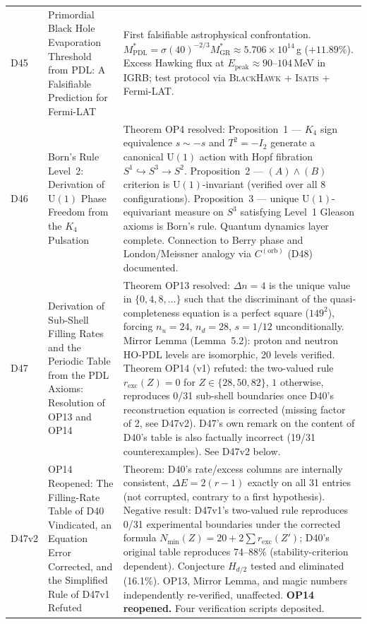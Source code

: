 \documentclass[11pt,a4paper]{article}
\theoremstyle{plain}
\theoremstyle{definition}
\theoremstyle{remark}
\begin{document}
\begin{longtable}{L{1.3cm}L{3.8cm}L{8.0cm}}
D45 & Primordial Black Hole Evaporation Threshold from PDL: A Falsifiable Prediction for Fermi-LAT~\cite{D45} & First falsifiable astrophysical confrontation. $M^*_{\mathrm{PDL}} = \sigma(40)^{-2/3} M^*_{\mathrm{GR}} \approx 5.706 \times 10^{14}$\,g ($+11.89\%$). Excess Hawking flux at $E_{\mathrm{peak}} \approx 90$--$104$\,MeV in IGRB; test protocol via \textsc{BlackHawk} + \textsc{Isatis} + Fermi-LAT.\\[0.4em]
D46 & Born's Rule Level~2: Derivation of $\mathrm{U}(1)$ Phase Freedom from the $K_4$ Pulsation~\cite{D46} & \textcolor{proofblue}{Theorem} OP4 resolved: Proposition~1 — $K_4$ sign equivalence $s \sim -s$ and $T^2=-I_2$ generate a canonical $\mathrm{U}(1)$ action with Hopf fibration $S^1\hookrightarrow S^3\to S^2$. Proposition~2 — $(A)\wedge(B)$ criterion is $\mathrm{U}(1)$-invariant (verified over all 8 configurations). Proposition~3 — unique $\mathrm{U}(1)$-equivariant measure on $S^3$ satisfying Level~1 Gleason axioms is Born's rule. Quantum dynamics layer complete. Connection to Berry phase and London/Meissner analogy via $C^{(\mathrm{orb})}$ (D48) documented.\\[0.4em]
D47 & Derivation of Sub-Shell Filling Rates and the Periodic Table from the PDL Axioms: Resolution of OP13 and OP14~\cite{D47} & \textcolor{proofblue}{Theorem} OP13 resolved: $\Delta n=4$ is the unique value in $\{0,4,8,\ldots\}$ such that the discriminant of the quasi-completeness equation is a perfect square ($149^2$), forcing $n_u=24$, $n_d=28$, $s=1/12$ unconditionally. Mirror Lemma (Lemma~5.2): proton and neutron HO-PDL levels are isomorphic, 20 levels verified. \textcolor{negativered}{Theorem OP14 (v1) refuted}: the two-valued rule $r_{\mathrm{exc}}(Z)=0$ for $Z\in\{28,50,82\}$, $1$ otherwise, reproduces 0/31 sub-shell boundaries once D40's reconstruction equation is corrected (missing factor of 2, see D47v2). D47's own remark on the content of D40's table is also factually incorrect (19/31 counterexamples). See D47v2 below. \\[0.4em]
D47v2 & OP14 Reopened: The Filling-Rate Table of D40 Vindicated, an Equation Error Corrected, and the Simplified Rule of D47v1 Refuted~\cite{D47v2} & \textcolor{proofblue}{Theorem}: D40's rate/excess columns are internally consistent, $\Delta E=2(r-1)$ exactly on all 31 entries (not corrupted, contrary to a first hypothesis). \textcolor{negativered}{Negative result}: D47v1's two-valued rule reproduces 0/31 experimental boundaries under the corrected formula $N_{\min}(Z)=20+2\sum r_{\mathrm{exc}}(Z')$; D40's original table reproduces 74--88\% (stability-criterion dependent). Conjecture $H_{d/2}$ tested and eliminated (16.1\%). OP13, Mirror Lemma, and magic numbers independently re-verified, unaffected. \textbf{OP14 reopened.} Four verification scripts deposited.\\[0.4em]

\end{longtable}
\end{document}
